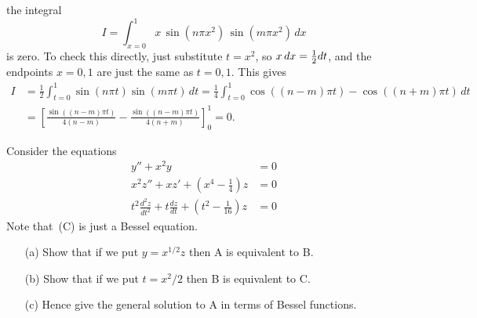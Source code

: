 \documentclass[a4paper]{amsart}
\begin{document}
\begin{solution}
\begin{itemize}
   the integral
   \[ I = \int_{x=0}^1 x\,\sin(n\pi x^2)\,\sin(m\pi x^2)\, dx \]
   is zero.  To check this directly, just substitute $t=x^2$, so
   $x\,dx=\tfrac{1}{2} dt$, and the endpoints $x=0,1$ are just the same as
   $t=0,1$.  This gives
   \begin{align*}
    I &= \frac{1}{2}\int_{t=0}^1 \sin(n\pi t)\sin(m\pi t)\,dt
       = \frac{1}{4}\int_{t=0}^1
        \cos((n-m)\pi t) - \cos((n+m)\pi t)\,dt \\
      &= \left[\frac{\sin((n-m)\pi t)}{4(n-m)} -
                \frac{\sin((n-m)\pi t)}{4(n+m)}\right]_0^1 = 0.
   \end{align*}
 \end{itemize}
\end{solution}

\begin{exercise}\label{ex-transform-a}
 Consider the equations
 \begin{align*}
  y''+x^2y &= 0 \tag{A} \\
  x^2z'' + xz' + (x^4-\tfrac{1}{4})z &= 0 \tag{B} \\
  t^2\frac{d^2z}{dt^2} + t\frac{dz}{dt} + (t^2 - \tfrac{1}{16}) z &= 0 \tag{C}
 \end{align*}
 Note that~(C) is just a Bessel equation.
 \begin{itemize}
  \item[(a)] Show that if we put $y=x^{1/2}z$ then A is equivalent to B.
  \item[(b)] Show that if we put $t=x^2/2$ then B is equivalent to C.
  \item[(c)] Hence give the general solution to A in terms of Bessel functions.
 \end{itemize}
\end{exercise}
\end{document}

